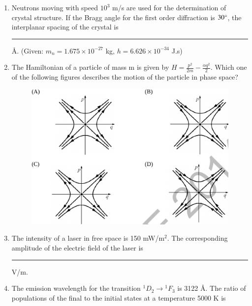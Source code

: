 \documentclass[journal,12pt,onecolumn]{IEEEtran}
\theoremstyle{remark}
\begin{document}
\begin{enumerate}
\item Neutrons moving with speed $10^3$ m/s are used for the determination of crystal structure. If the Bragg angle for the first order diffraction is $30\degree$, the interplanar spacing of the crystal is \rule{3cm}{0.4pt} \AA. (Given: $m_n = 1.675 \times 10^{-27}$ kg, $h = 6.626 \times 10^{-34}$ J.s)\hfill{}

\item The Hamiltonian of a particle of mass m is given by $H = \frac{p^2}{2m} - \frac{\alpha q^2}{2}$. Which one of the following figures describes the motion of the particle in phase space?
\hfill{}
\begin{figure}[H]
\centering
 \caption*{} \label{fig:54} \includegraphics{figs/q54.png}
\end{figure}
\item The intensity of a laser in free space is 150 mW/m$^2$. The corresponding amplitude of the electric field of the laser is \rule{3cm}{0.4pt} V/m. \hfill{}

\item The emission wavelength for the transition ${}^1D_2 \rightarrow {}^1F_3$ is 3122 \AA. The ratio of populations of the final to the initial states at a temperature 5000 K is 
\hfill{} \begin{enumerate}  \end{enumerate}


\end{enumerate}
\end{document}

